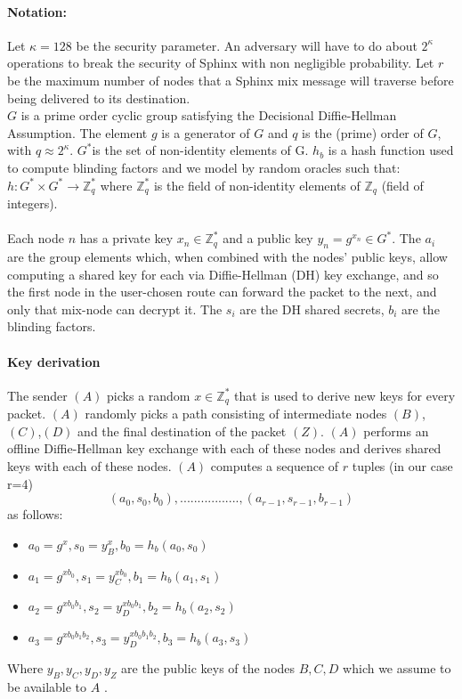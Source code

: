 \paragraph{Notation:}Let $\kappa=128$ be the security parameter. An adversary will have to do about $2^\kappa$ operations to break the security of Sphinx with non negligible probability.
Let $r$ be the maximum number of nodes that a Sphinx mix message will traverse before being delivered to its destination.
\\$G$ is a prime order cyclic group satisfying the Decisional Diffie-Hellman Assumption. The element $g$ is a generator of $G$ and $q$ is the (prime) order of $G$, with $q\approx2^{\kappa}$.
$G^*$is the set of non-identity elements of G. $h_b$ is a hash function used to compute blinding factors and we model by random oracles such that:
$h:G^*\times G^*\rightarrow\mathbb{Z}^*_q$ where $\mathbb{Z}^*_q$ is the field of non-identity elements of $\mathbb{Z}_q$ (field of integers).
    \\~\\Each node $n$ has a private key $x_n\in \mathbb{Z}^*_q$ and a public key $y_n=g^{x_n}\in G^*$.
    The $a_i$ are the group elements which, when combined with the nodes’ public keys, allow computing a shared key for each via Diffie-Hellman (DH) key exchange, and so the first node in the user-chosen route can forward the packet to the next, and only that mix-node can decrypt it.
    The $s_i$ are the DH shared secrets, $b_i$ are the blinding factors.

    \paragraph{Key derivation}
    The sender $(A)$ picks a random $x\in \mathbb{Z}^*_q$ that is used to derive new keys for every packet.
    \newline $(A)$ randomly picks a path consisting of intermediate nodes $(B)$, $(C)$,$(D)$ and the final destination of the packet $(Z)$.
    \newline $(A)$ performs an offline Diffie-Hellman key exchange with each of these nodes and derives shared keys with each of these nodes.
    \newline $(A)$ computes a sequence of $r$ tuples (in our case r=4)  $$(a_0,s_0,b_0),.................,(a_{r-1},s_{r-1},b_{r-1})$$ as follows:
    \begin{itemize}
        \item $a_0=g^x,s_0=y^x_B,b_0=h_b(a_0,s_0)$
        \item $a_1=g^{xb_0},s_1=y^{xb_0}_C,b_1=h_b(a_1,s_1)$
        \item $a_2=g^{xb_0b_1},s_2=y^{xb_0b_1}_D,b_2=h_b(a_2,s_2)$
        \item $a_3=g^{xb_0b_1b_2},s_3=y^{xb_0b_1b_2}_D,b_3=h_b(a_3,s_3)$
    \end{itemize}
    Where $y_B,y_C,y_D,y_Z$ are the public keys of the nodes $B,C, D$  which we assume to be available to $A$ .

